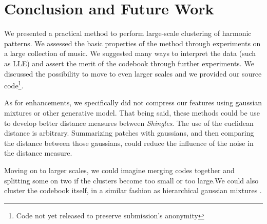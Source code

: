 \documentclass{article}
\begin{document}
\section{Conclusion and Future Work}
We presented a practical method to perform large-scale clustering of
harmonic patterns. We assessed the basic properties of the method through
experiments on a large collection of music. We suggested many ways
to interpret the data (such as LLE) and assert the merit of the codebook
through further experiments.
We discussed the possibility to move to even larger scales
and we provided our source code\footnote{Code not yet released to preserve
submission's anonymity}.

As for enhancements, we specifically did not compress our features using
gaussian mixtures or other generative model. That being said, these methods
could be use to develop better distance measures between \textit{Shingles}.
The use of the euclidean distance is arbitrary. Summarizing patches
with gaussians, and then comparing the distance between those gaussians,
could reduce the influence of the noise in the distance measure.

Moving on to larger scales, we could imagine merging codes together and
splitting some on two if the clusters become too small or too large.We could
also cluster the codebook itself, in a similar fashion as hierarchical
gaussian mixtures \cite{Vasconcelos2001}.


\small



\end{document}
